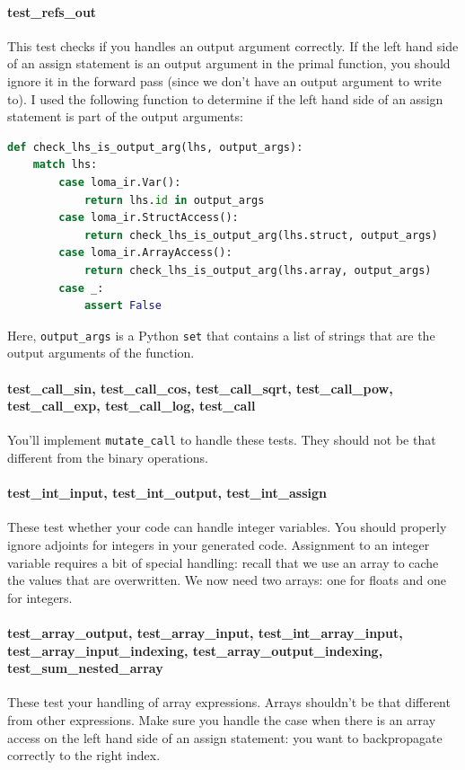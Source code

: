 \paragraph{test_refs_out} This test checks if you handles an output argument correctly. If the left hand side of an assign statement is an output argument in the primal function, you should ignore it in the forward pass (since we don't have an output argument to write to). I used the following function to determine if the left hand side of an assign statement is part of the output arguments:
\begin{lstlisting}[language=Python]
def check_lhs_is_output_arg(lhs, output_args):
    match lhs:
        case loma_ir.Var():
            return lhs.id in output_args
        case loma_ir.StructAccess():
            return check_lhs_is_output_arg(lhs.struct, output_args)
        case loma_ir.ArrayAccess():
            return check_lhs_is_output_arg(lhs.array, output_args)
        case _:
            assert False
\end{lstlisting}
Here, \lstinline{output_args} is a Python \lstinline{set} that contains a list of strings that are the output arguments of the function.

\paragraph{test_call_sin, test_call_cos, test_call_sqrt, test_call_pow, test_call_exp, test_call_log, test_call} You'll implement \lstinline{mutate_call} to handle these tests. They should not be that different from the binary operations.

\paragraph{test_int_input, test_int_output, test_int_assign} These test whether your code can handle integer variables. You should properly ignore adjoints for integers in your generated code. Assignment to an integer variable requires a bit of special handling: recall that we use an array to cache the values that are overwritten. We now need two arrays: one for floats and one for integers.

\paragraph{test_array_output, test_array_input, test_int_array_input, test_array_input_indexing, test_array_output_indexing, test_sum_nested_array} These test your handling of array expressions. Arrays shouldn't be that different from other expressions. Make sure you handle the case when there is an array access on the left hand side of an assign statement: you want to backpropagate correctly to the right index.

